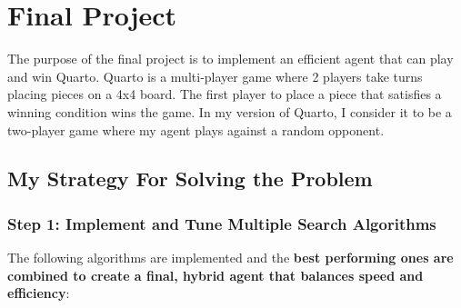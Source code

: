 
\section{Final Project}

The purpose of the final project is to implement an efficient agent that can play and win Quarto. Quarto is a multi-player game where 2 players take turns placing pieces on a 4x4 board. The first player to place a piece that satisfies a winning condition wins the game. In my version of Quarto, I consider it to be a two-player game where my agent plays against a random opponent.

\subsection{My Strategy For Solving the Problem}

\subsubsection{Step 1: Implement and Tune Multiple Search Algorithms}

The following algorithms are implemented and the \textbf{best performing ones are combined to create a final, hybrid agent that balances speed and efficiency}:

